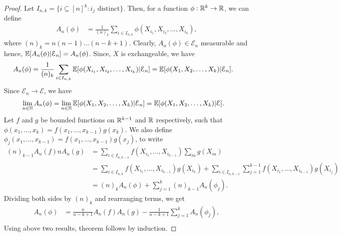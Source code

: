 \documentclass[a4paper,10pt,english]{article}
\begin{document}
\begin{proof} Let $I_{n,k} = \{i \subseteq [n]^k: i_j \text{ distinct}\}$. Then, for a function $\phi: \mathbb{R}^k \to \mathbb{R}$, we can define
\begin{align*}
A_n(\phi) &= \frac{1}{(n)_k}\sum_{i \in I_{n,k}}\phi(X_{i_1}, X_{i_2}, \ldots, X_{i_k}),
\end{align*}
where $(n)_k = n(n-1)\ldots(n-k+1)$. Clearly, $A_n(\phi) \in \mathcal{E}_n$ measurable and hence,
$\mathbb{E}[A_n(\phi)|\mathcal{E}_n] = A_n(\phi)$. Since, $X$ is exchangeable, we have
\begin{align*}
A_n(\phi) &= \frac{1}{(n)_k}\sum_{i \in I_{n,k}}\mathbb{E}[\phi(X_{i_1}, X_{i_2}, \ldots, X_{i_k})|\mathcal{E}_n] = \mathbb{E}[\phi(X_{1}, X_{2}, \ldots, X_{k})|\mathcal{E}_n].
\end{align*}
Since $\mathcal{E}_n \to \mathcal{E}$, we have 
\begin{align*}
\lim_{n \in \mathbb{N}} A_n(\phi) &= \lim_{n \in \mathbb{N}} \mathbb{E}[\phi(X_{1}, X_{2}, \ldots, X_{k})|\mathcal{E}_n] = \mathbb{E}[\phi(X_{1}, X_{2}, \ldots, X_{k})|\mathcal{E}] .
\end{align*}
Let $f$ and $g$ be bounded functions on $\mathbb{R}^{k-1}$ and $\mathbb{R}$ respectively, such that $\phi(x_1,\ldots,x_k) = f(x_1,\ldots,x_{k-1})g(x_k)$. We also define $\phi_j(x_1,\ldots,x_{k-1}) = f(x_1,\ldots,x_{k-1})g(x_j)$, to write 
\begin{align*}
(n)_{k-1}A_n(f)nA_n(g) &= \sum_{i \in I_{n,k-1}}f(X_{i_1}, \ldots,X_{i_{k-1}})\sum_{m}g(X_{m})\\
&= \sum_{i \in I_{n,k}}f(X_{i_1}, \ldots,X_{i_{k-1}})g(X_{i_k}) + \sum_{i \in I_{n,k-1}}\sum_{j=1}^{k-1}f(X_{i_1},\ldots,X_{i_{k-1}})g(X_{i_j})\\
&= (n)_kA_n(\phi) + \sum_{j=1}^k(n)_{k-1}A_n(\phi_j).
\end{align*}
Dividing both sides by $(n)_k$ and rearranging terms, we get
\begin{align*}
A_n(\phi)& = \frac{n}{n-k+1}A_n(f)A_n(g) - \frac{1}{n-k+1}\sum_{j=1}^kA_n(\phi_j),\\
\end{align*}
Using above two results, theorem follows by induction.
\end{proof}
\end{document}
